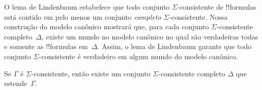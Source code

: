 \documentclass[../../../include/open-logic-section]{subfiles}
\begin{document}


O lema de Lindenbaum estabelece que todo conjunto $\Sigma$-consistente
de !!{formula}s está contido em pelo menos um conjunto \emph{completo}
$\Sigma$-consistente. Nossa construção do modelo canônico mostrará que,
para cada conjunto $\Sigma$-consistente completo~$\Delta$, existe um
mundo no modelo canônico no qual são verdadeiras todas e somente as
!!{formula}s em~$\Delta$. Assim, o lema de Lindenbaum garante que todo
conjunto $\Sigma$-consistente é verdadeiro em algum mundo do modelo
canônico.

\begin{thm}
  Se $\Gamma$ é $\Sigma$-consistente, então existe um conjunto
  $\Sigma$-consistente completo $\Delta$ que estende~$\Gamma$.
\end{thm}
\end{document}
